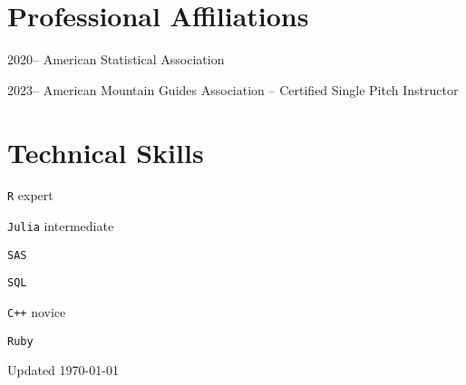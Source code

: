 \documentclass[12pt,letterpaper]{report}
\newcommand{\listitemspace}{0.15em}
\renewenvironment{itemize}
{\begin{list}{}{\setlength{\leftmargin}{0em}
            \setlength{\parskip}{0em}
            \setlength{\itemsep}{\listitemspace}
            \setlength{\parsep}{\listitemspace}}}
    {\end{list}}
\begin{document}
    \section*{Professional Affiliations}

    \begin{tablist}

        \item[2020--] \tab American Statistical Association
        
        	\item[2023--] \tab American Mountain Guides Association -- Certified Single Pitch Instructor

    \end{tablist}

    \section*{Technical Skills}

    \begin{itemize}

        \item \texttt{R} \tab expert
        
        \item \texttt{Julia} \tab intermediate
        
        	\item \texttt{SAS}

		\item \texttt{SQL}
        
        \item \texttt{C++} \tab novice
        
        \item \texttt{Ruby}

    \end{itemize}

    \begin{center}
        \vfill
        Updated \monthyeardate\today
    \end{center}
\end{document}
